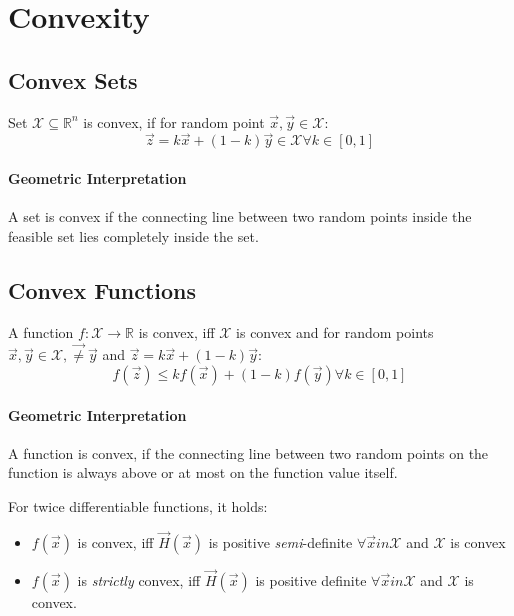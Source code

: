 \section{Convexity}



\subsection{Convex Sets}

Set $\mathcal{X} \subseteq \mathbb R^n$ is convex, if for random point $\vec x, \vec y \in \mathcal{X}$:
\begin{equation*}
\vec z = k \vec x + (1 - k)\vec y \in \mathcal{X} \forall k \in [0, 1]
\end{equation*}

\paragraph{Geometric Interpretation} A set is convex if the connecting line between two random points inside the feasible set lies completely inside the set.


\subsection{Convex Functions}

A function $f:\mathcal{X} \to \mathbb R$ is convex, iff $\mathcal{X}$ is convex and for random points $\vec x, \vec y \in \mathcal{X}, \vec \neq \vec y$ and $\vec z = k \vec x +(1-k)\vec y$:
\begin{equation*}
f(\vec z) \leq kf(\vec x) + (1 - k)f(\vec y) \forall k \in [0, 1]
\end{equation*}

\paragraph{Geometric Interpretation} A function is convex, if the connecting line between two random points on the function is always above or at most on the function value itself.

For twice differentiable functions, it holds: 
\begin{itemize}
	\item $f(\vec x)$ is convex, iff $\vec H(\vec x)$ is positive \emph{semi}-definite $\forall \vec x in \mathcal{X}$ and $\mathcal{X}$ is convex
	\item $f(\vec x)$ is \emph{strictly} convex, iff $\vec H(\vec x)$ is positive definite $\forall \vec x in \mathcal{X}$ and $\mathcal{X}$ is convex.
\end{itemize}

